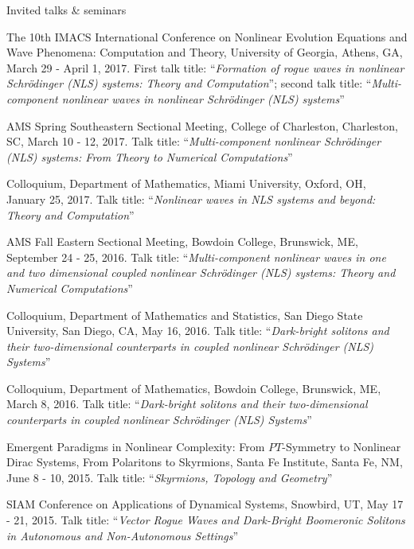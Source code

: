 \documentclass[10pt]{article} %
\begin{document}
\begin{section}{Invited talks \& seminars}
\begin{etaremune}
\item   The 10th IMACS International Conference on Nonlinear Evolution Equations and Wave Phenomena: Computation and Theory, %
        University of Georgia, Athens, GA, March 29 - April 1, 2017. 
        First talk title: ``\textit{Formation of rogue waves in nonlinear Schr\"odinger (NLS) systems: Theory and Computation}'';      
        second talk title: ``\textit{Multi-component nonlinear waves in nonlinear Schr\"odinger (NLS) systems}''
         
\item   AMS Spring Southeastern Sectional Meeting, College of Charleston, Charleston, SC, March 10 - 12, 2017.
        Talk title: ``\textit{Multi-component nonlinear Schr\"odinger (NLS) systems: From Theory to Numerical Computations}''   

\item   Colloquium, Department of Mathematics, Miami University, Oxford, OH, January 25, 2017.
        Talk title: ``\textit{Nonlinear waves in NLS systems and beyond: Theory and Computation}''

\item   AMS Fall Eastern Sectional Meeting, Bowdoin College, Brunswick, ME, September 24 - 25, 2016.
        Talk title: ``\textit{Multi-component nonlinear waves in one and two dimensional coupled nonlinear
        Schr\"odinger (NLS) systems: Theory and Numerical Computations}''
    
\item   Colloquium, Department of Mathematics and Statistics, San Diego State University, San Diego, CA, May 16, 2016.
        Talk title: ``\textit{Dark-bright solitons and their two-dimensional counterparts in coupled nonlinear Schr\"odinger (NLS) Systems}''

\item   Colloquium, Department of Mathematics, Bowdoin College, Brunswick, ME, March 8, 2016.
        Talk title: ``\textit{Dark-bright solitons and their two-dimensional counterparts in coupled nonlinear Schr\"odinger (NLS) Systems}''
    
\item   Emergent Paradigms in Nonlinear Complexity: From $PT$-Symmetry to Nonlinear Dirac Systems, From Polaritons to Skyrmions, %
        Santa Fe Institute, Santa Fe, NM, June 8 - 10, 2015. Talk title: ``\textit{Skyrmions, Topology and Geometry}''

\item   SIAM Conference on Applications of Dynamical Systems, Snowbird, UT, May 17 - 21, 2015. Talk title: %
        ``\textit{Vector Rogue Waves and Dark-Bright Boomeronic Solitons in Autonomous and Non-Autonomous Settings}''


\end{etaremune}
\end{section}
\end{document}
